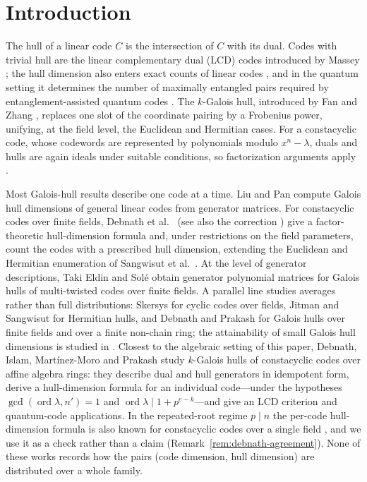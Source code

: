 \documentclass[11pt,a4paper]{article}
\numberwithin{equation}{section}
\theoremstyle{plain}
\theoremstyle{definition}
\theoremstyle{remark}
\begin{document}
\section{Introduction}\label{sec:intro}
The hull of a linear code $C$ is the intersection of $C$ with its dual.
Codes with trivial hull are the linear complementary dual (LCD) codes
introduced by Massey \cite{massey1992}; the hull dimension also enters exact
counts of linear codes \cite{sendrier1997}, and in the quantum setting it
determines the number of maximally entangled pairs required by
entanglement-assisted quantum codes \cite{brun2006,wildeBrun2008}. The
$k$-Galois hull, introduced by Fan and Zhang \cite{fanZhang2017}, replaces
one slot of the coordinate pairing by a Frobenius power, unifying, at the
field level, the Euclidean and Hermitian cases. For a constacyclic code, whose codewords are
represented by polynomials modulo $x^n-\lambda$, duals and hulls are again
ideals under suitable conditions, so factorization arguments apply
\cite{huffmanPless2003}.

Most Galois-hull results describe one code at a time. Liu and Pan
\cite{liuPan2020} compute Galois hull dimensions of general linear codes from
generator matrices. For constacyclic codes over finite fields, Debnath et
al.\ \cite{debnathConstacyclic2023} (see also the correction
\cite{debnathCorrection2023}) give a factor-theoretic hull-dimension
formula and, under restrictions on the field parameters, count the codes
with a prescribed hull dimension, extending the Euclidean and Hermitian
enumeration of Sangwisut et al.\ \cite{sangwisut2015}. At the level of
generator descriptions, Taki Eldin and Sol\'e \cite{eldinSole2026} obtain
generator polynomial matrices for Galois hulls of multi-twisted codes over
finite fields. A parallel line studies averages rather than full
distributions: Skersys \cite{skersys2003} for cyclic codes over fields,
Jitman and Sangwisut \cite{jitmanSangwisut2018} for Hermitian hulls, and
Debnath and Prakash \cite{debnathAverage2025} for Galois hulls over finite
fields and over a finite non-chain ring; the attainability of small Galois
hull dimensions is studied in \cite{debnathSmall2026}. Closest to the
algebraic setting of this paper, Debnath, Islam, Mart\'inez-Moro and Prakash
\cite{debnathAffine2026} study $k$-Galois hulls of constacyclic codes over
affine algebra rings: they describe dual and hull generators in idempotent
form, derive a hull-dimension formula for an individual code---under the
hypotheses $\gcd(\operatorname{ord}\lambda,n')=1$ and
$\operatorname{ord}\lambda\mid 1+p^{e-k}$---and give an LCD criterion and
quantum-code applications. In the repeated-root regime $p\mid n$ the
per-code hull-dimension formula is also known for constacyclic codes over a
single field \cite{debnathConstacyclic2023}, and we use it as a check rather
than a claim (Remark~\ref{rem:debnath-agreement}). None of these works
records how the pairs (code dimension, hull dimension) are distributed over
a whole family.
\end{document}
